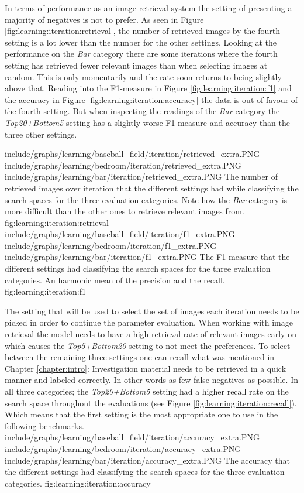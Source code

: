 In terms of performance as an image retrieval system the setting of presenting a majority of negatives is not to prefer. As seen in Figure \ref{fig:learning:iteration:retrieval}, the number of retrieved images by the fourth setting is a lot lower than the number for the other settings. Looking at the performance on the \emph{Bar} category there are some iterations where the fourth setting has retrieved fewer relevant images than when selecting images at random. This is only momentarily and the rate soon returns to being slightly above that. Reading into the F1-measure in Figure \ref{fig:learning:iteration:f1} and the accuracy in Figure \ref{fig:learning:iteration:accuracy} the data is out of favour of the fourth setting. But when inspecting the readings of the \emph{Bar} category the \emph{Top20+Bottom5} setting has a slightly worse F1-measure and accuracy than the three other settings. 

\tripfigurenear
{include/graphs/learning/baseball_field/iteration/retrieved_extra.PNG}
{include/graphs/learning/bedroom/iteration/retrieved_extra.PNG}
{include/graphs/learning/bar/iteration/retrieved_extra.PNG}
{The number of retrieved images over iteration that the different settings had while classifying the search spaces for the three evaluation categories. Note how the \emph{Bar} category is more difficult than the other ones to retrieve relevant images from.}
{fig:learning:iteration:retrieval}
\tripfigurenear
{include/graphs/learning/baseball_field/iteration/f1_extra.PNG}
{include/graphs/learning/bedroom/iteration/f1_extra.PNG}
{include/graphs/learning/bar/iteration/f1_extra.PNG}
{The F1-measure that the different settings had classifying the search spaces for the three evaluation categories. An harmonic mean of the precision and the recall.}
{fig:learning:iteration:f1}


The setting that will be used to select the set of images each iteration needs to be picked in order to continue the parameter evaluation. When working with image retrieval the model needs to have a high retrieval rate of relevant images early on which causes the \emph{Top5+Bottom20} setting to not meet the preferences. To select between the remaining three settings one can recall what was mentioned in Chapter \ref{chapter:intro}: Investigation material needs to be retrieved in a quick manner and labeled correctly. In other words as few false negatives as possible. In all three categories; the \emph{Top20+Bottom5} setting had a higher recall rate on the search space throughout the evaluations (see Figure \ref{fig:learning:iteration:recall}). Which means that the first setting is the most appropriate one to use in the following benchmarks. 
\tripfigure
{include/graphs/learning/baseball_field/iteration/accuracy_extra.PNG}
{include/graphs/learning/bedroom/iteration/accuracy_extra.PNG}
{include/graphs/learning/bar/iteration/accuracy_extra.PNG}
{The accuracy that the different settings had classifying the search spaces for the three evaluation categories.}
{fig:learning:iteration:accuracy}
